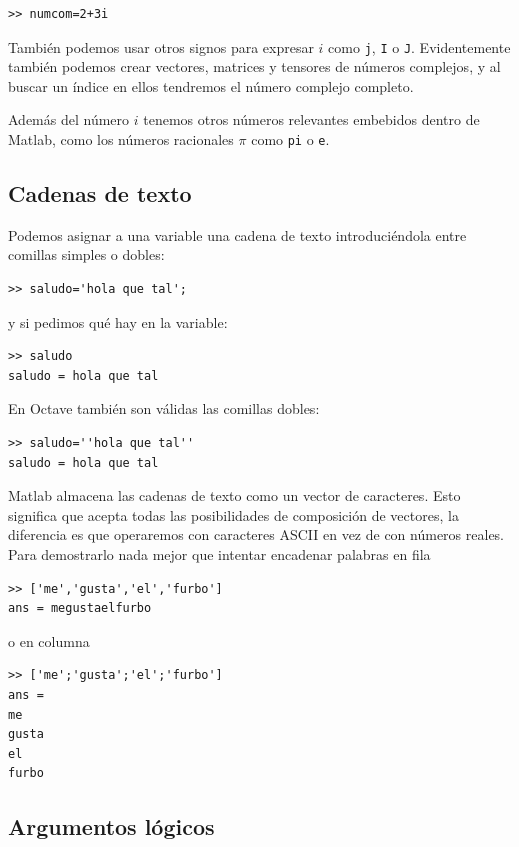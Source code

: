 \begin{verbatim}
>> numcom=2+3i
\end{verbatim}

También podemos usar otros signos para expresar \texttt{$i$} como
\texttt{j}, \texttt{I} o \texttt{J}. Evidentemente también podemos
crear vectores, matrices y tensores de números complejos, y al buscar
un índice en ellos tendremos el número complejo completo.

Además del número \texttt{$i$} tenemos otros números relevantes
embebidos dentro de Matlab, como los números racionales $\pi$ como
\texttt{pi} o \texttt{e}.


\subsection{Cadenas de texto}

Podemos asignar a una variable una cadena de texto introduciéndola
entre comillas simples o dobles:

\begin{verbatim}
>> saludo='hola que tal';
\end{verbatim}
y si pedimos qué hay en la variable:

\begin{verbatim}
>> saludo
saludo = hola que tal
\end{verbatim}
En Octave también son válidas las comillas dobles:

\begin{verbatim}
>> saludo=''hola que tal''
saludo = hola que tal
\end{verbatim}
Matlab almacena las cadenas de texto como un vector de caracteres.
Esto significa que acepta todas las posibilidades de composición de
vectores, la diferencia es que operaremos con caracteres ASCII en vez
de con números reales. Para demostrarlo nada mejor que intentar
encadenar palabras en fila

\begin{verbatim}
>> ['me','gusta','el','furbo']
ans = megustaelfurbo
\end{verbatim}
o en columna

\begin{verbatim}
>> ['me';'gusta';'el';'furbo']
ans =
me
gusta
el
furbo
\end{verbatim}

\subsection{Argumentos lógicos}


